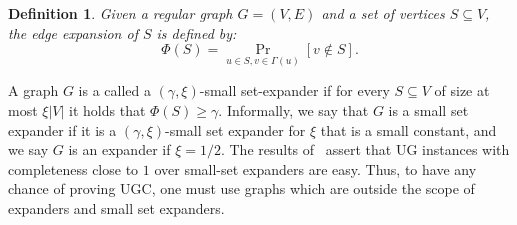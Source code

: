 \documentclass[11pt]{article}
\def \sos {SoS\xspace}
\def \eps {{\varepsilon}}
\newtheorem{definition}[theorem]{Definition}
\theoremstyle{definition}
\begin{document}
\begin{definition}
Given a regular graph $G=(V,E)$ and a set 
of vertices $S\subseteq V$, the edge expansion of $S$ is defined by:
\[
\Phi(S) = \Pr_{u\in S, v\in \Gamma(u)}\left[v\not\in S\right].
\]
\end{definition}
A graph $G$ is a called a $(\gamma,\xi)$-small set-expander if for every $S\subseteq V$ of size at most $\xi |V|$  it holds that $\Phi(S)\geq \gamma$. Informally, we say that $G$ is a small set expander if it is a $(\gamma,\xi)$-small set 
expander for $\xi$ that is a small constant, and we say $G$ is an expander 
if $\xi = 1/2$. The results of~\cite{AroraKKSTV08,MMlocalexpander,DBLP:journals/eccc/AroraIMS10,BBKSS}
 assert that UG instances with completeness close to $1$ over small-set expanders are easy. 
Thus, to have any chance of proving UGC, one must use graphs 
which are outside the scope of expanders and small set expanders.
\end{document}
